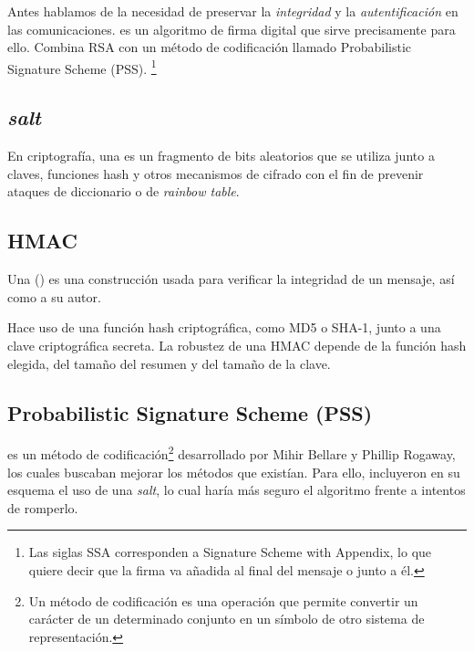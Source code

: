 \label{RSASSA-PSS}

Antes hablamos de la necesidad de preservar la \emph{integridad} y la \emph{autentificación} en las comunicaciones.
 es un algoritmo de firma digital que sirve precisamente para ello.
Combina RSA con un método de codificación llamado Probabilistic Signature Scheme (PSS).
\footnote{Las siglas SSA corresponden a Signature Scheme with Appendix, lo que quiere decir que la firma va añadida al final del mensaje o junto a él.}

\subsection{\emph{salt}}

En criptografía, una  es un fragmento de bits aleatorios
que se utiliza junto a claves, funciones hash y otros mecanismos de cifrado con
el fin de prevenir ataques de diccionario o de \emph{rainbow table}.
\emph{\parencite{Reference32}}

\subsection{HMAC}

\label{HMAC}

Una  () es una
construcción usada para verificar la integridad de un mensaje, así como a su
autor.

Hace uso de una función hash criptográfica, como MD5 o SHA-1, junto a una clave
criptográfica secreta. La robustez de una HMAC depende de la función hash
elegida, del tamaño del resumen y del tamaño de la clave.
\emph{\parencite{Reference31}}

\subsection{Probabilistic Signature Scheme (PSS)}

\label{PSS}

 es un método de codificación\footnote{Un método de codificación es una operación que permite convertir un carácter de un determinado conjunto en un símbolo de otro sistema de representación.}
desarrollado por Mihir Bellare y Phillip Rogaway, los cuales buscaban mejorar los métodos que existían.
Para ello, incluyeron en su esquema el uso de una \emph{salt}, lo cual haría más seguro el algoritmo frente a intentos de romperlo. \emph{\parencite{Reference15}}

